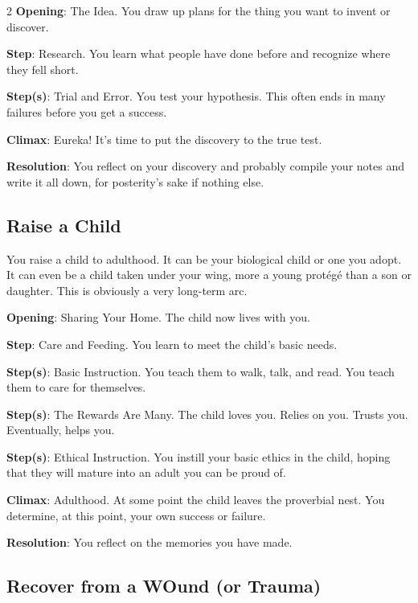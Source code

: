 \begin{multicols}{2}
\textbf{Opening}: The Idea. You draw up plans for the thing you want to invent or discover.

\textbf{Step}: Research. You learn what people have done before and recognize where they fell short.

\textbf{Step(s)}: Trial and Error. You test your hypothesis. This often ends in many failures before you get a success.

\textbf{Climax}: Eureka! It’s time to put the discovery to the true test. 

\textbf{Resolution}: You reflect on your discovery and probably compile your notes and write it all down, for posterity’s sake if nothing else.

\subsection{Raise a Child}

You raise a child to adulthood. It can be your biological child or one you adopt. It can even be a child taken under your wing, more a young protégé than a son or daughter. This is obviously a very long-term arc. 

\textbf{Opening}: Sharing Your Home. The child now lives with you.

\textbf{Step}: Care and Feeding. You learn to meet the child’s basic needs.

\textbf{Step(s)}: Basic Instruction. You teach them to walk, talk, and read. You teach them to care for themselves.

\textbf{Step(s)}: The Rewards Are Many. The child loves you. Relies on you. Trusts you. Eventually, helps you.

\textbf{Step(s)}: Ethical Instruction. You instill your basic ethics in the child, hoping that they will mature into an adult you can be proud of.

\textbf{Climax}: Adulthood. At some point the child leaves the proverbial nest. You determine, at this point, your own success or failure.

\textbf{Resolution}: You reflect on the memories you have made.

\subsection{Recover from a WOund (or Trauma)}


\end{multicols}
